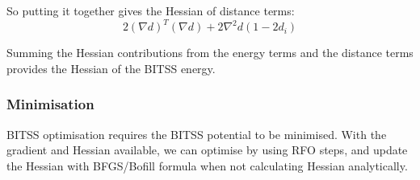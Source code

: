 \documentclass[10pt]{article}
\begin{document}
So putting it together gives the Hessian of distance terms:
$$2 (\nabla d)^T (\nabla d) + 2 \nabla^2 d \left( 1 - 2d_i \right)$$

Summing the Hessian contributions from the energy terms and the distance terms provides the Hessian of the BITSS energy.

\subsubsection{Minimisation}

BITSS optimisation requires the BITSS potential to be minimised. With the gradient and Hessian available, we can optimise by using RFO steps, and update the Hessian with BFGS/Bofill formula when not calculating Hessian analytically.
\end{document}
